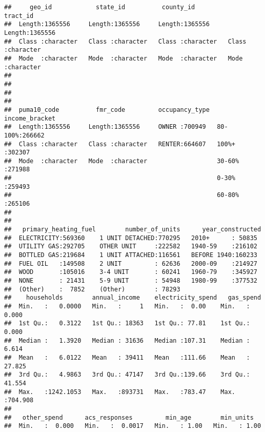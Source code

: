 \documentclass[]{article}
\begin{document}
\begin{verbatim}
##     geo_id            state_id          county_id           tract_id        
##  Length:1365556     Length:1365556     Length:1365556     Length:1365556    
##  Class :character   Class :character   Class :character   Class :character  
##  Mode  :character   Mode  :character   Mode  :character   Mode  :character  
##                                                                             
##                                                                             
##                                                                             
##                                                                             
##  puma10_code          fmr_code         occupancy_type  income_bracket  
##  Length:1365556     Length:1365556     OWNER :700949   80-100%:266662  
##  Class :character   Class :character   RENTER:664607   100%+  :302307  
##  Mode  :character   Mode  :character                   30-60% :271988  
##                                                        0-30%  :259493  
##                                                        60-80% :265106  
##                                                                        
##                                                                        
##   primary_heating_fuel        number_of_units      year_constructed 
##  ELECTRICITY:569360    1 UNIT DETACHED:770295   2010+      : 50835  
##  UTILITY GAS:292705    OTHER UNIT     :222582   1940-59    :216102  
##  BOTTLED GAS:219684    1 UNIT ATTACHED:116561   BEFORE 1940:160233  
##  FUEL OIL   :149508    2 UNIT         : 62636   2000-09    :214927  
##  WOOD       :105016    3-4 UNIT       : 60241   1960-79    :345927  
##  NONE       : 21431    5-9 UNIT       : 54948   1980-99    :377532  
##  (Other)    :  7852    (Other)        : 78293                       
##    households        annual_income    electricity_spend   gas_spend      
##  Min.   :   0.0000   Min.   :     1   Min.   :  0.00    Min.   :  0.000  
##  1st Qu.:   0.3122   1st Qu.: 18363   1st Qu.: 77.81    1st Qu.:  0.000  
##  Median :   1.3920   Median : 31636   Median :107.31    Median :  6.614  
##  Mean   :   6.0122   Mean   : 39411   Mean   :111.66    Mean   : 27.825  
##  3rd Qu.:   4.9863   3rd Qu.: 47147   3rd Qu.:139.66    3rd Qu.: 41.554  
##  Max.   :1242.1053   Max.   :893731   Max.   :783.47    Max.   :704.908  
##                                                                          
##   other_spend      acs_responses         min_age        min_units     
##  Min.   :  0.000   Min.   :  0.0017   Min.   : 1.00   Min.   : 1.00   

\end{verbatim}
\end{document}
